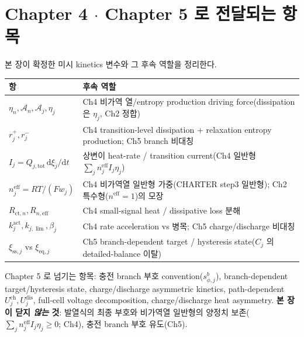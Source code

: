 \documentclass[11pt,a4paper]{article}
\newcommand{\dd}{\mathrm{d}}
\newcommand{\eff}{\mathrm{eff}}
\newcommand{\eq}{\mathrm{eq}}
\newcommand{\tot}{\mathrm{tot}}
\newcommand{\ct}{\mathrm{ct}}
\newcommand{\sstat}{\mathrm{ss}}
\begin{document}
\section{Chapter 4 $\cdot$ Chapter 5 로 전달되는 항목}\label{sec:ch3_transmit}
본 장이 확정한 미시 kinetics 변수와 그 후속 역할을 정리한다.
\begin{longtable}{p{} >{\raggedright\arraybackslash}p{}}
\toprule 항 & 후속 역할 \\ \midrule \endhead
$\eta_n,\mathcal A_n,\mathcal A_j,\eta_j$ & Ch4 비가역 열/entropy production driving force(dissipation 은 $\eta_j$, Ch2 정합) \\
$r_j^+,r_j^-$ & Ch4 transition-level dissipation + relaxation entropy production; Ch5 branch 비대칭 \\
$I_j=Q_{j,\tot}\,\dd\xi_j/\dd t$ & 상변이 heat-rate / transition current(Ch4 일반형 $\sum_j n_j^\eff I_j\eta_j$) \\
$n_j^{\eff}=RT/(Fw_j)$ & Ch4 비가역열 일반형 가중(CHARTER step3 일반형); Ch2 특수형($n^\eff=1$)의 모장 \\
$R_{\ct,n},R_{n,\eff}$ & Ch4 small-signal heat / dissipative loss 분해 \\
$k_j^{\mathrm{act}},k_{j,\lim},\beta_j$ & Ch4 rate acceleration vs 병목; Ch5 charge/discharge 비대칭 \\
$\xi_{\sstat,j}$ vs $\xi_{\eq,j}$ & Ch5 branch-dependent target / hysteresis state($C_j$ 의 detailed-balance 이탈) \\
\bottomrule
\end{longtable}
Chapter 5 로 넘기는 항목: 충전 branch 부호 convention($s_{\phi,j}^b$), branch-dependent target/hysteresis
state, charge/discharge asymmetric kinetics, path-dependent $U_j^{\mathrm{ch}},U_j^{\mathrm{dis}}$, full-cell
voltage decomposition, charge/discharge heat asymmetry. \textbf{본 장이 닫지 \emph{않는} 것}: 발열식의 최종
부호와 비가역열 일반형의 양정치 보존($\sum_j n_j^\eff I_j\eta_j\ge0$; Ch4), 충전 branch 부호 유도(Ch5).

\end{document}
